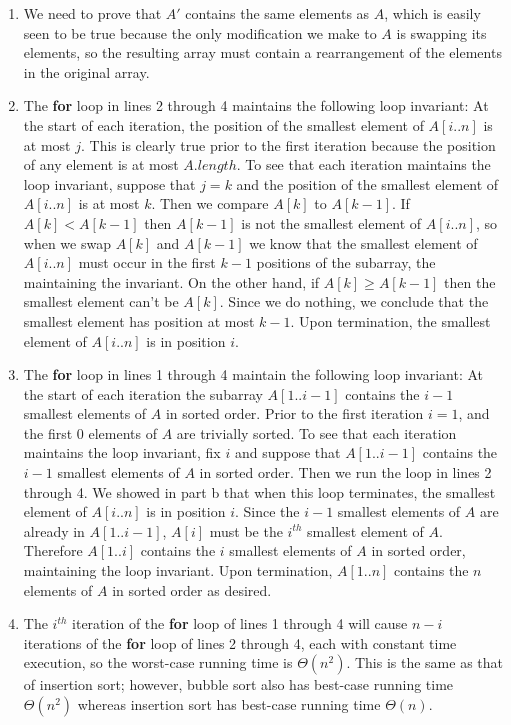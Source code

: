 \documentclass{article}
\begin{document}
\begin{enumerate}
\item We need to prove that $A'$ contains the same elements as $A$, which is easily seen to be true because the only modification we make to $A$ is swapping its elements, so the resulting array must contain a rearrangement of the elements in the original array. \\

\item The \textbf{for} loop in lines 2 through 4 maintains the following loop invariant: At the start of each iteration, the position of the smallest element of $A[i..n]$ is at most $j$.  This is clearly true prior to the first iteration because the position of any element is at most $A.length$.  To see that each iteration maintains the loop invariant, suppose that $j=k$ and the position of the smallest element of $A[i..n]$ is at most $k$.  Then we compare $A[k]$ to $A[k-1]$.  If $A[k] < A[k-1]$ then $A[k-1]$ is not the smallest element of $A[i..n]$, so when we swap $A[k]$ and $A[k-1]$ we know that the smallest element of $A[i..n]$ must occur in the first $k-1$ positions of the subarray, the maintaining the invariant.  On the other hand, if $A[k] \geq A[k-1]$ then the smallest element can't be $A[k]$.  Since we do nothing, we conclude that the smallest element has position at most $k-1$.  Upon termination, the smallest element of $A[i..n]$ is in position $i$.  \\

\item The \textbf{for} loop in lines 1 through 4 maintain the following loop invariant:  At the start of each iteration the subarray $A[1..i-1]$ contains the $i-1$ smallest elements of $A$ in sorted order.  Prior to the first iteration $i=1$, and the first 0 elements of $A$ are trivially sorted.  To see that each iteration maintains the loop invariant, fix $i$ and suppose that $A[1..i-1]$ contains the $i-1$ smallest elements of $A$ in sorted order.  Then we run the loop in lines 2 through 4.  We showed in part b that when this loop terminates, the smallest element of $A[i..n]$ is in position $i$.  Since the $i-1$ smallest elements of $A$ are already in $A[1..i-1]$, $A[i]$ must be the $i^{th}$ smallest element of $A$.  Therefore $A[1..i]$ contains the $i$ smallest elements of $A$ in sorted order, maintaining the loop invariant.  Upon termination, $A[1..n]$ contains the $n$ elements of $A$ in sorted order as desired. \\

\item The $i^{th}$ iteration of the \textbf{for} loop of lines 1 through 4 will cause $n-i$ iterations of the \textbf{for} loop of lines 2 through 4, each with constant time execution, so the worst-case running time is $\Theta(n^2)$.  This is the same as that of insertion sort; however, bubble sort also has best-case running time $\Theta(n^2)$ whereas insertion sort has best-case running time $\Theta(n)$. \\

\end{enumerate}
\end{document}
